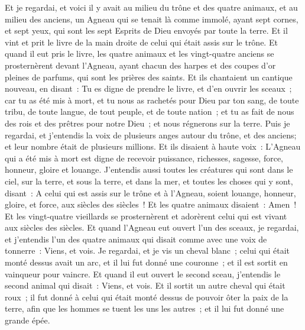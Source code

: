 \begin{multicols}{2}
Et je regardai, et voici il y avait au milieu du trône et des quatre animaux, et au milieu des anciens, un Agneau qui se tenait là comme immolé, ayant sept cornes, et sept yeux, qui sont les sept Esprits de Dieu envoyés par toute la terre.
Et il vint et prit le livre de la main droite de celui qui était assis sur le trône.
Et quand il eut pris le livre, les quatre animaux et les vingt-quatre anciens se prosternèrent devant l'Agneau, ayant chacun des harpes et des coupes d'or pleines de parfums, qui sont les prières des saints.
Et ils chantaient un cantique nouveau, en disant~: Tu es digne de prendre le livre, et d'en ouvrir les sceaux~; car tu as été mis à mort, et tu nous as rachetés pour Dieu par ton sang, de toute tribu, de toute langue, de tout peuple, et de toute nation~;
et tu as fait de nous des rois et des prêtres pour notre Dieu~; et nous régnerons sur la terre.
Puis je regardai, et j'entendis la voix de plusieurs anges autour du trône, et des anciens; et leur nombre était de plusieurs millions.
Et ils disaient à haute voix~: L'Agneau qui a été mis à mort est digne de recevoir puissance, richesses, sagesse, force, honneur, gloire et louange.
J'entendis aussi toutes les créatures qui sont dans le ciel, sur la terre, et sous la terre, et dans la mer, et toutes les choses qui y sont, disant~: A celui qui est assis sur le trône et à l'Agneau, soient louange, honneur, gloire, et force, aux siècles des siècles~!
Et les quatre animaux disaient~: Amen~! Et les vingt-quatre vieillards se prosternèrent et adorèrent celui qui est vivant aux siècles des siècles.
\VerseOne{}Et quand l'Agneau eut ouvert l'un des sceaux, je regardai, et j'entendis l'un des quatre animaux qui disait comme avec une voix de tonnerre~: Viens, et vois.
Je regardai, et je vis un cheval blanc~; celui qui était monté dessus avait un arc, et il lui fut donné une couronne~; et il est sortit en vainqueur pour vaincre.
Et quand il eut ouvert le second sceau, j'entendis le second animal qui disait~: Viens, et vois.
Et il sortit un autre cheval qui était roux~; il fut donné à celui qui était monté dessus de pouvoir ôter la paix de la terre, afin que les hommes se tuent les uns les autres~; et il lui fut donné une grande épée.

\end{multicols}
